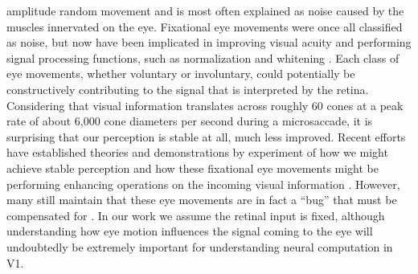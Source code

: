 amplitude random movement and is most often explained as noise caused by the muscles innervated on the eye. Fixational eye movements were once all classified as noise, but now have been implicated in improving visual acuity \parencite{ratnam2017benefits, rucci2007miniature} and performing signal processing functions, such as normalization and whitening \parencite{aytekin2014visual}. Each class of eye movements, whether voluntary or involuntary, could potentially be constructively contributing to the signal that is interpreted by the retina. Considering that visual information translates across roughly 60 cones at a peak rate of about 6,000 cone diameters per second during a microsaccade, it is surprising that our perception is stable at all, much less improved. Recent efforts have established theories and demonstrations by experiment of how we might achieve stable perception \parencite{arathorn2013unstable, bridgeman2010brain, murakami1998jitter, burak2010bayesian} and how these fixational eye movements might be performing enhancing operations on the incoming visual information \parencite{ahissar2012seeing, mostofi2016visual, kenyon2004correlated}. However, many still maintain that these eye movements are in fact a ``bug'' that must be compensated for \parencite{packer1992blurring, kowler1979miniature, engbert2011integrated}. In our work we assume the retinal input is fixed, although understanding how eye motion influences the signal coming to the eye will undoubtedly be extremely important for understanding neural computation in V1.


